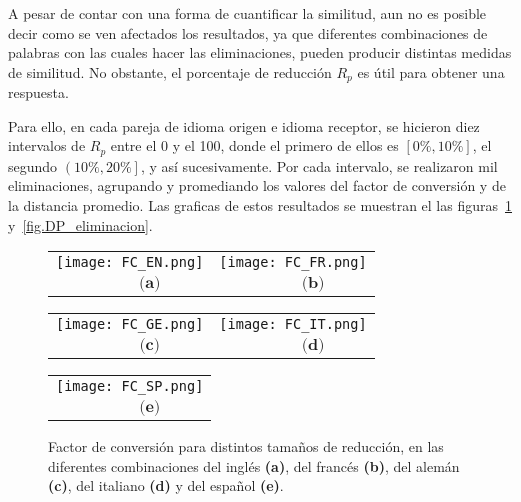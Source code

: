 

A pesar de contar con una forma de cuantificar la similitud, aun no es posible decir como se ven afectados los resultados, ya que diferentes combinaciones de palabras con las cuales hacer las eliminaciones, pueden producir distintas medidas de similitud.  No obstante, el porcentaje de reducción $R_{p}$ es útil para obtener una respuesta.

Para ello, en cada pareja de idioma origen e idioma receptor, se hicieron diez intervalos de $R_{p}$ entre el 0 y el 100, donde el primero de ellos es $\left[0\%, 10\% \right]$, el segundo $\left( 10\%, 20\% \right]$, y así sucesivamente. Por cada intervalo,  se realizaron mil eliminaciones, agrupando y promediando los valores del factor de conversión y de la distancia promedio. Las graficas de estos resultados se muestran el las figuras~\ref{fig.FC_eliminacion} y~\ref{fig.DP_eliminacion}.


\begin{figure}[h!] 
	\centering
	\begin{tabular}{cc}
		\texttt{[image: FC\_EN.png]} &
		\texttt{[image: FC\_FR.png]} \\
		$\,\,\,\,\,\,\,\,\,\,\,\,\,\,\, \textbf{(a)}$      & 
		$\,\,\,\,\,\,\,\,\,\,\,\,\,\,\, \textbf{(b)}$     \\
	\end{tabular}
	
	\begin{tabular}{cc}
		\texttt{[image: FC\_GE.png]} &
		\texttt{[image: FC\_IT.png]} \\
		$\,\,\,\,\,\,\,\,\,\,\,\,\,\,\, \textbf{(c)}$      & $\,\,\,\,\,\,\,\,\,\,\,\,\,\,\, \textbf{(d)}$     \\
	\end{tabular}
	\begin{tabular}{c}
		\texttt{[image: FC\_SP.png]} \\
		$\,\,\,\,\,\,\,\,\,\,\,\,\,\,\, \textbf{(e)}$     \\
	\end{tabular}
	\caption{Factor de conversión para distintos tamaños de reducción, en las diferentes combinaciones del inglés \textbf{(a)}, del francés \textbf{(b)}, del alemán \textbf{(c)}, del italiano \textbf{(d)} y del español \textbf{(e)}.}
	\label{fig.FC_eliminacion}
\end{figure} 


